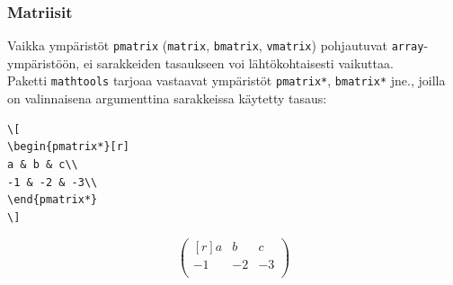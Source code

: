 \documentclass[handout]{beamer}
\theoremstyle{remark}
\newcommand{\vaihto}{\\ \vspace{10pt}}
\begin{document}
\begin{frame}[fragile]
\frametitle{Matriisit}
Vaikka ympäristöt \verb-pmatrix- (\verb-matrix-, \verb-bmatrix-, \verb-vmatrix-) pohjautuvat \verb-array--ympäristöön, ei sarakkeiden tasaukseen voi lähtökohtaisesti vaikuttaa. \vaihto Paketti \verb-mathtools- tarjoaa vastaavat ympäristöt \verb-pmatrix*-, \verb-bmatrix*- jne., joilla on valinnaisena argumenttina sarakkeissa käytetty tasaus:\vaihto

\begin{minipage}{4cm}
\begin{scriptsize}
\begin{Verbatim}[frame=single]
\[
\begin{pmatrix*}[r]
a & b & c\\
-1 & -2 & -3\\
\end{pmatrix*}
\]
\end{Verbatim}
\end{scriptsize}
\end{minipage}
\begin{minipage}{4cm}
\[
\begin{pmatrix*}[r]
a & b & c\\
-1 & -2 & -3\\
\end{pmatrix*}
\]
\end{minipage}
\end{frame}
\end{document}
